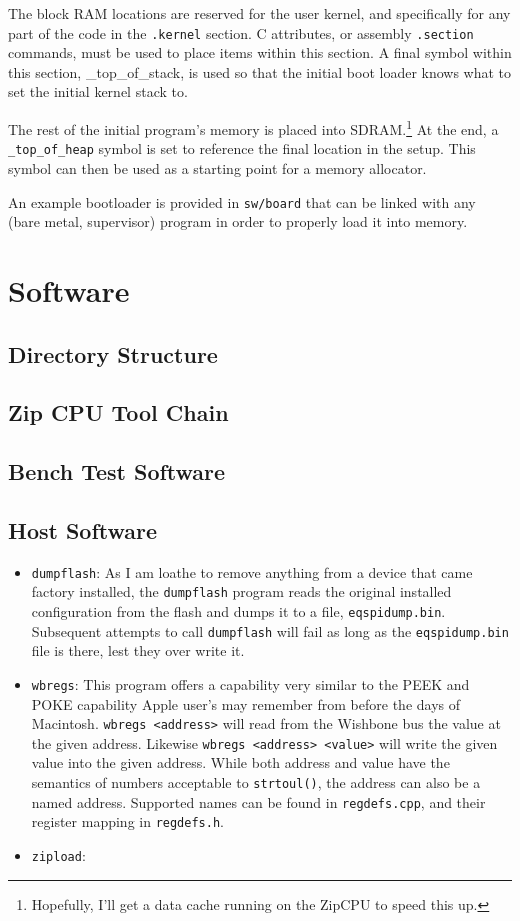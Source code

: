 \documentclass{gqtekspec}
\begin{document}
The block RAM locations are reserved for the user kernel, and specifically for
any part of the code in the {\tt .kernel} section.  C attributes, or assembly
{\tt .section} commands, must be used to place items within this section.
A final symbol within this section, {\_top\_of\_stack}, is used so that the
initial boot loader knows what to set the initial kernel stack to.

The rest of the initial program's memory is placed into
SDRAM.\footnote{Hopefully,
I'll get a data cache running on the ZipCPU to speed this up.}  At the end,
a {\tt \_top\_of\_heap} symbol is set to reference the final location in the
setup.  This symbol can then be used as a starting point for a memory allocator.

An example bootloader is provided in {\tt sw/board} that can be linked with
any (bare metal, supervisor) program in order to properly load it into memory.

\chapter{Software}
\section{Directory Structure}
\section{Zip CPU Tool Chain}
\section{Bench Test Software}
\section{Host Software}
\begin{itemize}
\item {\tt dumpflash}: As I am loathe to remove anything from a device that
	came factory installed, the {\tt dumpflash} program reads the original
	installed configuration from the flash and dumps it to a file, 
	{\tt eqspidump.bin}.  Subsequent attempts to call {\tt dumpflash}
	will fail as long as the {\tt eqspidump.bin} file is there, lest they
	over write it.

\item {\tt wbregs}: This program offers a capability very similar to the 
	PEEK and POKE capability Apple user's may remember from before the
	days of Macintosh.  {\tt wbregs <address>} will read from the
	Wishbone bus the value at the given address.  Likewise
	{\tt wbregs <address> <value>} will write the given value into the
	given address.  While both address and value have the semantics of
	numbers acceptable to {\tt strtoul()}, the address can also be a named
	address.  Supported names can be found in {\tt regdefs.cpp}, and their
	register mapping in {\tt regdefs.h}.
\item {\tt zipload}:
\end{itemize}
\end{document}
